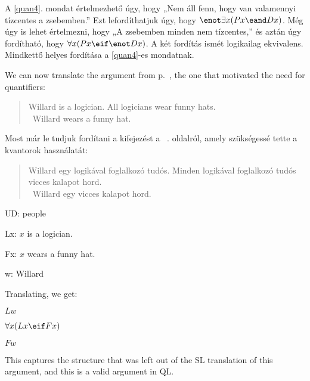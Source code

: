A \ref{quan4}. mondat értelmezhető úgy, hogy „Nem áll fenn, hogy van valamennyi tízcentes a zsebemben.” Ezt lefordíthatjuk úgy, hogy $\enot\exists x(Px \eand Dx)$. Még úgy is lehet értelmezni, hogy „A zsebemben minden nem tízcentes,” és aztán úgy fordítható, hogy $\forall x(Px \eif \enot Dx)$. A két fordítás ismét logikailag ekvivalens. Mindkettő helyes fordítása a \ref{quan4}-es mondatnak.

We can now translate the argument from p.~\pageref{willard1}, the one that motivated the need for quantifiers:
\begin{quote}
Willard is a logician. All logicians wear funny hats.\\
\therefore\ Willard wears a funny hat.
\end{quote}

Most már le tudjuk fordítani a kifejezést a ~\pageref{willard1}. oldalról, amely szükségessé tette a kvantorok használatát:
\begin{quote}
Willard egy logikával foglalkozó tudós. Minden logikával foglalkozó tudós vicces kalapot hord.\\
\therefore\ Willard egy vicces kalapot hord.
\end{quote}



\begin{ekey}
\item[UD:] people
\item[Lx:] $x$ is a logician.
\item[Fx:] $x$ wears a funny hat.
\item[w:] Willard
\end{ekey}
Translating, we get:
\begin{earg}
\item[] $Lw$
\item[] $\forall x(Lx \eif Fx)$
\item[\therefore] $Fw$
\end{earg}

This captures the structure that was left out of the SL translation of this argument, and this is a valid argument in QL.









